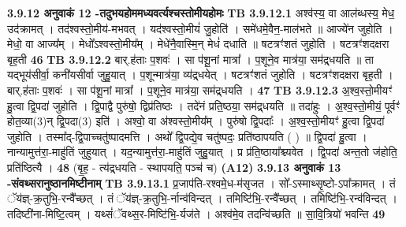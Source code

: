 \documentclass[17pt]{extarticle}
\begin{document}
{{{{{{{{{{{{{{{{{{{{{{                \textbf{ 3.9.12    अनुवाकं   12 -तदुभयहोममध्यवर्त्यश्चस्तोमीयहोमः} \newline
                                \textbf{ TB 3.9.12.1} \newline
                  अश्व॑स्य॒ वा आल॑ब्धस्य॒ मेध॒ उद॑क्रामत् । तद॑श्वस्तो॒मीय॑-मभवत् । यद॑श्वस्तो॒मीयं॑ जु॒होति॑ । समे॑धमे॒वैन॒-माल॑भते ॥ आज्ये॑न जुहोति । मेधो॒ वा आज्य᳚म् । मेधो᳚ऽश्वस्तो॒मीय᳚म् । मेधे॑नै॒वास्मि॒न् मेधं॑ दधाति ॥ षटत्रꣳ॑शतं जुहोति । षटत्रꣳ॑शदक्षरा बृह॒ती \textbf{ 46} \newline
                  \newline
                                \textbf{ TB 3.9.12.2} \newline
                  बार्.ह॑ताः प॒शवः॑ । सा प॑शू॒नां मात्रा᳚ । प॒शूने॒व मात्र॑या॒ सम॑द्र्धयति ॥ ता यद्भूय॑सीर्वा॒ कनी॑यसीर्वा जुहु॒यात् । प॒शून्मात्र॑या॒ व्य॑द्र्धयेत् । षटत्रꣳ॑शतं जुहोति । षटत्रꣳ॑शदक्षरा बृह॒ती । बार्.ह॑ताः प॒शवः॑ । सा प॑शू॒नां मात्रा᳚ । प॒शूने॒व मात्र॑या॒ सम॑द्र्धयति । \textbf{ 47} \newline
                  \newline
                                \textbf{ TB 3.9.12.3} \newline
                  अ॒श्व॒स्तो॒मीयꣳ॑ हु॒त्वा द्वि॒पदा॑ जुहोति । द्वि॒पाद्वै पुरु॑षो॒ द्विप्र॑तिष्ठः । तदे॑नं प्रति॒ष्ठया॒ सम॑द्र्धयति ॥ तदा॑हुः । अ॒श्व॒स्तो॒मीयं॒ पूर्वꣳ॑ होत॒व्या(3)न् द्वि॒पदा(3) इति॑ । अश्वो॒ वा अ॑श्वस्तो॒मीय᳚म् । पुरु॑षो द्वि॒पदाः᳚ । अ॒श्व॒स्तो॒मीयꣳ॑ हु॒त्वा द्वि॒पदा॑ जुहोति । तस्मा᳚द्-द्वि॒पाच्चतु॑ष्पादमत्ति । अथो᳚ द्वि॒पद्ये॒व चतु॑ष्पदः॒ प्रति॑ष्ठापयति ( ) ॥ द्वि॒पदा॑ हु॒त्वा । नान्यामुत्त॑रा॒-माहु॑तिं जुहुयात् । यद॒न्यामुत्त॑रा॒-माहु॑तिं जुहु॒यात् । प्र प्र॑ति॒ष्ठाया᳚श्च्यवेत । द्वि॒पदा॑ अन्त॒तो ज॑होति॒ प्रति॑ष्ठित्यै । \textbf{ 48} \newline
                  \newline
                                    (बृ॒ह॒ - त्य॑द्र्धयति - स्थापयति॒ पञ्च॑ च) \textbf{(A12)} \newline \newline
                \textbf{ 3.9.13    अनुवाकं   13 -संवथ्सरानुष्ठानमिष्टीनाम्} \newline
                                \textbf{ TB 3.9.13.1} \newline
                  प्र॒जाप॑ति-रश्वमे॒ध-म॑सृजत । सो᳚-ऽस्माथ्सृ॒ष्टो-ऽपा᳚क्रामत् । तं ॅय॑ज्ञ्-क्र॒तुभि॒-रन्वै᳚च्छत् । तं ॅय॑ज्ञ्-क्र॒तुभि॒-र्नान्व॑विन्दत् । तमिष्टि॑भि॒-रन्वै᳚च्छत् । तमिष्टि॑भि॒-रन्व॑विन्दत् । तदिष्टी॑ना-मिष्टि॒त्वम् । यथ्सं॑ॅवथ्स॒र-मिष्टि॑भि॒-र्यज॑ते । अश्व॑मे॒व तदन्वि॑च्छति ॥ सा॒वि॒त्रियो॑ भवन्ति \textbf{ 49} \newline
}}}}}}}}}}}}}}}}}}}}}}
\end{document}
